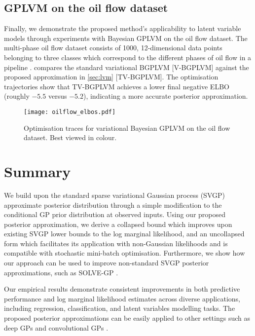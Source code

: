\subsection{GPLVM on the oil flow dataset}
Finally, we demonstrate the proposed method's applicability to latent variable models through experiments with Bayesian GPLVM on the oil flow dataset.  The multi-phase oil flow dataset consists of 1000, 12-dimensional data points belonging to three classes which correspond to the different phases of oil flow in a pipeline \citep{bishop1993analysis}.  compares the standard variational BGPLVM \citep{damianou16a,lalchand22a} [V-BGPLVM] against the proposed approximation in \cref{sec:lvm} [TV-BGPLVM]. The optimisation trajectories show that TV-BGPLVM achieves a lower final negative ELBO (roughly $-5.5$ versus $-5.2$), indicating a more accurate posterior approximation.

\begin{figure}[!t]
    \centering
    \texttt{[image: oilflow\_elbos.pdf]}
    \caption{Optimisation traces for variational Bayesian GPLVM on the oil flow dataset. Best viewed in colour.}
    \label{fig:oil_flow}
\end{figure}

\section{Summary}
We build upon the standard sparse variational Gaussian process (SVGP) approximate posterior distribution through a simple modification to the conditional GP prior distribution at observed inputs. Using our proposed posterior approximation, we derive a collapsed bound which improves upon existing SVGP lower bounds to the log marginal likelihood, and an uncollapsed form which facilitates its application with non-Gaussian likelihoods and is compatible with stochastic mini-batch optimisation. Furthermore, we show how our approach can be used to improve non-standard SVGP posterior approximations, such as SOLVE-GP \citep{shi2020sparse}.

Our empirical results demonstrate consistent improvements in both predictive performance and log marginal likelihood estimates across diverse applications, including regression, classification, and latent variables modelling tasks. The proposed posterior approximations can be easily applied to other settings such as deep GPs and convolutional GPs \citep{van2017convolutional,blomqvist2020deep,sun2021scalable,bui16,salimbeni2017doubly}.